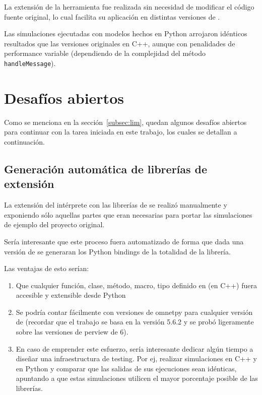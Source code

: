 La extensión de la herramienta \omnetpp{} fue realizada sin necesidad de
modificar el código fuente original, lo cual facilita su aplicación en
distintas versiones de \omnetpp{}.

Las simulaciones ejecutadas con modelos hechos en Python arrojaron idénticos
resultados que las versiones originales en C++, aunque con penalidades de
performance variable (dependiendo de la complejidad del método \verb!handleMessage!).

\section{Desafíos abiertos}

Como se menciona en la sección~\ref{subsec:lim}, quedan algunos desafíos
abiertos para continuar con la tarea iniciada en este trabajo, los cuales se
detallan a continuación.

\subsection{Generación automática de librerías de extensión}

La extensión del intérprete con las librerías de \omnetpp{} se realizó
manualmente y exponiendo sólo aquellas partes que eran necesarias para portar
las simulaciones de ejemplo del proyecto original.

Sería interesante que este proceso fuera automatizado de forma que dada una
versión de \omnetpp{} se generaran los Python bindings de la totalidad de la
librería.

Las ventajas de esto serían:

\begin{enumerate}
    \item Que cualquier función, clase, método, macro, tipo definido en
    \omnetpp{} (en C++) fuera accesible y extensible desde Python

    \item Se podría contar fácilmente con versiones de omnetpy para cualquier
    versión de \omnetpp{} (recordar que el trabajo se basa en la versión 5.6.2 y se
    probó ligeramente sobre las versiones de perview de \omnetpp{} 6).

    \item En caso de emprender este esfuerzo, sería interesante dedicar algún
    tiempo a diseñar una infraestructura de testing. Por ej, realizar simulaciones
    en C++ y en Python y comparar que las salidas de sus ejecuciones sean
    idénticas, apuntando a que estas simulaciones utilicen el mayor porcentaje
    posible de las librerías.
\end{enumerate}

